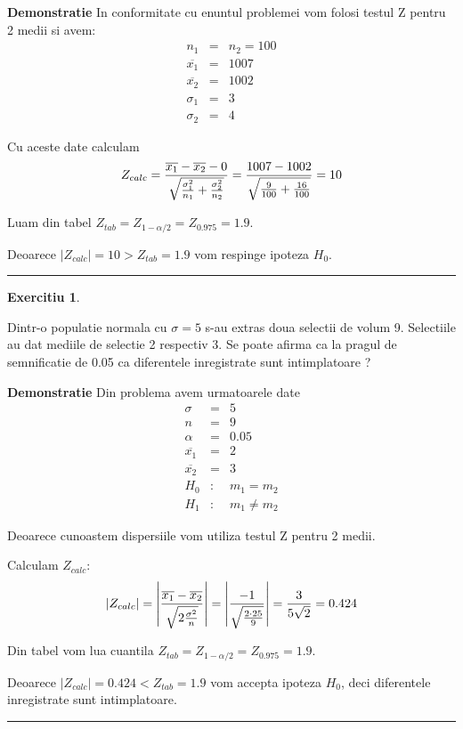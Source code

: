 \documentclass{article}
\newtheorem{exercise}[theorem]{Exercitiu}
\newenvironment{proof}[1][Proof]{\noindent\textbf{Demonstratie} }{\ \rule{0.5em}{0.5em}}
\begin{document}
\begin{proof}
In conformitate cu enuntul problemei vom folosi testul Z pentru 2 medii si
avem:%
\begin{eqnarray*}
n_{1} &=&n_{2}=100 \\
\overline{x_{1}} &=&1007 \\
\overline{x_{2}} &=&1002 \\
\sigma _{1} &=&3 \\
\sigma _{2} &=&4
\end{eqnarray*}

Cu aceste date calculam%
\[
Z_{calc}=\frac{\overline{x_{1}}-\overline{x_{2}}-0}{\sqrt{\frac{\sigma
_{1}^{2}}{n_{1}}+\frac{\sigma _{2}^{2}}{n_{2}}}}=\frac{1007-1002}{\sqrt{%
\frac{9}{100}+\frac{16}{100}}}=10
\]

Luam din tabel $Z_{tab}=Z_{1-\alpha /2}=Z_{0.975}=1.9$.

Deoarece $\left\vert Z_{calc}\right\vert =10>Z_{tab}=1.9$ vom respinge
ipoteza $H_{0}$.
\end{proof}

\begin{exercise}
\end{exercise}

Dintr-o populatie normala cu $\sigma =5$ s-au extras doua selectii de volum
9. Selectiile au dat mediile de selectie 2 respectiv 3. Se poate afirma ca
la pragul de semnificatie de 0.05 ca diferentele inregistrate sunt
intimplatoare ?

\begin{proof}
Din problema avem urmatoarele date%
\begin{eqnarray*}
\sigma  &=&5 \\
n &=&9 \\
\alpha  &=&0.05 \\
\overline{x_{1}} &=&2 \\
\overline{x_{2}} &=&3 \\
H_{0} &:&m_{1}=m_{2} \\
H_{1} &:&m_{1}\neq m_{2}
\end{eqnarray*}

Deoarece cunoastem dispersiile vom utiliza testul Z pentru 2 medii.

Calculam $Z_{calc}$:%
\[
\left\vert Z_{calc}\right\vert =\left\vert \frac{\overline{x_{1}}-\overline{%
x_{2}}}{\sqrt{2\frac{\sigma ^{2}}{n}}}\right\vert =\left\vert \frac{-1}{%
\sqrt{\frac{2\cdot 25}{9}}}\right\vert =\frac{3}{5\sqrt{2}}=0.424
\]

Din tabel vom lua cuantila $Z_{tab}=Z_{1-\alpha /2}=Z_{0.975}=1.9$.

Deoarece $\left\vert Z_{calc}\right\vert =0.424<Z_{tab}=1.9$ vom accepta
ipoteza $H_{0}$, deci diferentele inregistrate sunt intimplatoare.
\end{proof}
\end{document}
